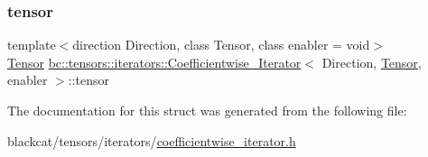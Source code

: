 \mbox{\label{structbc_1_1tensors_1_1iterators_1_1Coefficientwise__Iterator_a57cc6a9c7df0597c90d03309e367cbd2}} 
\subsubsection{\texorpdfstring{tensor}{tensor}}
{\footnotesize\ttfamily template$<$direction Direction, class Tensor, class enabler = void$>$ \\
\hyperlink{namespacebc_a659391e47ab612be3ba6c18cf9c89159}{Tensor} \hyperlink{structbc_1_1tensors_1_1iterators_1_1Coefficientwise__Iterator}{bc\+::tensors\+::iterators\+::\+Coefficientwise\+\_\+\+Iterator}$<$ Direction, \hyperlink{namespacebc_a659391e47ab612be3ba6c18cf9c89159}{Tensor}, enabler $>$\+::tensor}



The documentation for this struct was generated from the following file\+:\begin{DoxyCompactItemize}
\item 
blackcat/tensors/iterators/\hyperlink{coefficientwise__iterator_8h}{coefficientwise\+\_\+iterator.\+h}\end{DoxyCompactItemize}
